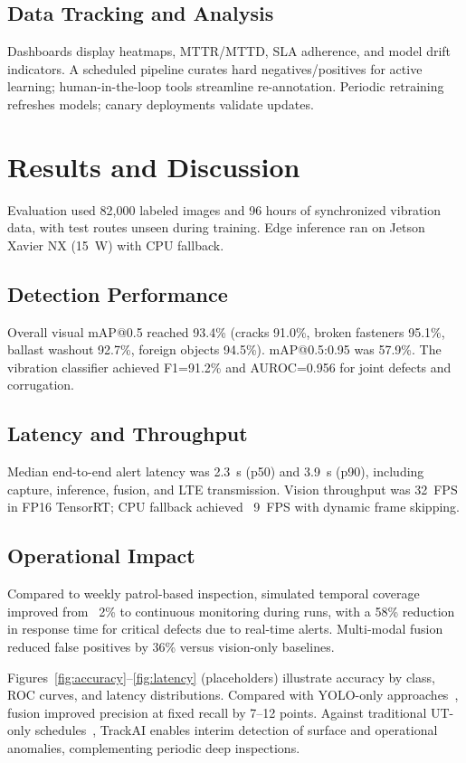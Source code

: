 \documentclass[conference]{IEEEtran}
\begin{document}
\subsection{Data Tracking and Analysis}
Dashboards display heatmaps, MTTR/MTTD, SLA adherence, and model drift indicators. A scheduled pipeline curates hard negatives/positives for active learning; human-in-the-loop tools streamline re-annotation. Periodic retraining refreshes models; canary deployments validate updates.

\section{Results and Discussion}
\label{sec:results}
Evaluation used 82{,}000 labeled images and 96 hours of synchronized vibration data, with test routes unseen during training. Edge inference ran on Jetson Xavier NX (15~W) with CPU fallback.

\subsection{Detection Performance}
Overall visual mAP@0.5 reached 93.4\% (cracks 91.0\%, broken fasteners 95.1\%, ballast washout 92.7\%, foreign objects 94.5\%). mAP@0.5:0.95 was 57.9\%. The vibration classifier achieved F1=91.2\% and AUROC=0.956 for joint defects and corrugation.

\subsection{Latency and Throughput}
Median end-to-end alert latency was 2.3~s (p50) and 3.9~s (p90), including capture, inference, fusion, and LTE transmission. Vision throughput was 32~FPS in FP16 TensorRT; CPU fallback achieved ~9~FPS with dynamic frame skipping.

\subsection{Operational Impact}
Compared to weekly patrol-based inspection, simulated temporal coverage improved from ~2\% to continuous monitoring during runs, with a 58\% reduction in response time for critical defects due to real-time alerts. Multi-modal fusion reduced false positives by 36\% versus vision-only baselines.

Figures~\ref{fig:accuracy}--\ref{fig:latency} (placeholders) illustrate accuracy by class, ROC curves, and latency distributions. Compared with YOLO-only approaches~\cite{islam2020yolo}, fusion improved precision at fixed recall by 7--12 points. Against traditional UT-only schedules~\cite{clark2017ultrasonic}, TrackAI enables interim detection of surface and operational anomalies, complementing periodic deep inspections.
\end{document}
